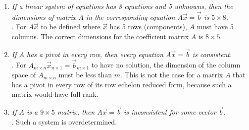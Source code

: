 \documentclass[12pt]{article}
\begin{document}
\begin{enumerate}[label=(\alph*)]
	\item \textit{If a linear system of equations has 8 equations and 5
	unknowns, then the dimensions of matrix $A$ in the corresponding equation
	$A\vec{x} = \vec{b}$ is $5 \times 8$.} \\[\baselineskip]
	. For $A\vec{x}$ to be defined where $\vec{x}$ has 5
	rows (components), $A$ must have 5 columns. The correct dimensions for the
	coefficient matrix $A$ is $8 \times 5$.
	\newpage
	
	\item \textit{If $A$ has a pivot in every row, then every equation
	$A\vec{x} = \vec{b}$ is consistent.} \\[\baselineskip]
	. For
	$A_{m \times n}\vec{x}_{n \times 1} = \vec{b}_{m \times 1}$ to have no
	solution, the dimension of the column space of $A_{m \times n}$ must be
	less than $m$. This is not the case for a matrix $A$ that has a pivot in
	every row of its row echelon reduced form, because such a matrix would
	have full rank.
	
	\item \textit{If $A$ is a $9 \times 5$ matrix, then $A\vec{x} = \vec{b}$
	is inconsistent for some vector $\vec{b}$.} \\[\baselineskip]
	. Such a system is overdetermined.
\end{enumerate}
\end{document}
